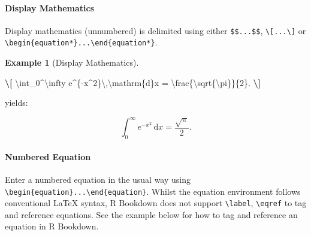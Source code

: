 \documentclass[
]{article}
\newenvironment{Shaded}{\begin{snugshade}}{\end{snugshade}}
\newcommand{\NormalTok}[1]{#1}
\newcommand{\SpecialCharTok}[1]{\textcolor[rgb]{0.81,0.36,0.00}{\textbf{#1}}}
\numberwithin{equation}{section}
\numberwithin{figure}{section}
\theoremstyle{break}
\theoremstyle{definition}
\theoremstyle{definition}
\newtheorem{example}{Example}[section]
\theoremstyle{definition}
\theoremstyle{definition}
\theoremstyle{remark}
\begin{document}
\hypertarget{display-mathematics}{%
\paragraph*{Display Mathematics}\label{display-mathematics}}

Display mathematics (unnumbered) is delimited using either \texttt{\$\$...\$\$}, \texttt{\textbackslash{}{[}...\textbackslash{}{]}} or \texttt{\textbackslash{}begin\{equation*\}...\textbackslash{}end\{equation*\}}.

\begin{example}[Display Mathematics]
\leavevmode

\begin{Shaded}
\begin{Highlighting}[]
\SpecialCharTok{\textbackslash{}[}
\NormalTok{ \textbackslash{}int\_0\^{}\textbackslash{}infty e\^{}\{{-}x\^{}2\}\textbackslash{},\textbackslash{}mathrm\{d\}x = \textbackslash{}frac\{\textbackslash{}sqrt\{\textbackslash{}pi\}\}\{2\}. }
\SpecialCharTok{\textbackslash{}]}
\end{Highlighting}
\end{Shaded}

yields:

\[
 \int_0^\infty e^{-x^2}\,\mathrm{d}x = \frac{\sqrt{\pi}}{2}. 
\]

\end{example}

\hypertarget{numbered-equation}{%
\paragraph*{Numbered Equation}\label{numbered-equation}}

Enter a numbered equation in the usual way using \texttt{\textbackslash{}begin\{equation\}...\textbackslash{}end\{equation\}}. Whilst the equation environment follows conventional LaTeX syntax, R Bookdown does not support \texttt{\textbackslash{}label}, \texttt{\textbackslash{}eqref} to tag and reference equations. See the example below for how to tag and reference an equation in R Bookdown.
\end{document}
